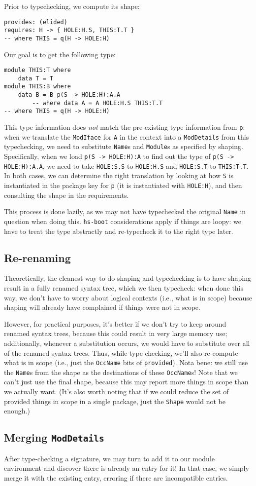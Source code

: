 \documentclass{article}
\begin{document}
Prior to typechecking, we compute its shape:

\begin{verbatim}
provides: (elided)
requires: H -> { HOLE:H.S, THIS:T.T }
-- where THIS = q(H -> HOLE:H)
\end{verbatim}

Our goal is to get the following type:

\begin{verbatim}
module THIS:T where
    data T = T
module THIS:B where
    data B = B p(S -> HOLE:H):A.A
        -- where data A = A HOLE:H.S THIS:T.T
-- where THIS = q(H -> HOLE:H)
\end{verbatim}

This type information does \emph{not} match the pre-existing
type information from \verb|p|: when we translate the \verb|ModIface| for
\verb|A| in the context into a \verb|ModDetails| from this typechecking,
we need to substitute \verb|Name|s and \verb|Module|s
as specified by shaping.  Specifically, when we load \verb|p(S -> HOLE:H):A|
to find out the type of \verb|p(S -> HOLE:H):A.A|,
we need to take \verb|HOLE:S.S| to \verb|HOLE:H.S| and \verb|HOLE:S.T| to \verb|THIS:T.T|.
In both cases, we can determine the right translation by looking at how \verb|S| is
instantiated in the package key for \verb|p| (it is instantiated with \verb|HOLE:H|),
and then consulting the shape in the requirements.

This process is done lazily, as we may not have typechecked the original
\verb|Name| in question when doing this.  \verb|hs-boot| considerations apply
if things are loopy: we have to treat the type abstractly and re-typecheck it
to the right type later.


\subsection{Re-renaming}

Theoretically, the cleanest way to do shaping and typechecking is to have shaping
result in a fully renamed syntax tree, which we then typecheck: when done this way,
we don't have to worry about logical contexts (i.e., what is in scope) because
shaping will already have complained if things were not in scope.

However, for practical purposes, it's better if we don't try to keep
around renamed syntax trees, because this could result in very large
memory use; additionally, whenever a substitution occurs, we would have
to substitute over all of the renamed syntax trees.  Thus, while
type-checking, we'll also re-compute what is in scope (i.e.,  just the
\verb|OccName| bits of \verb|provided|). Nota bene: we still use the
\verb|Name|s from the shape as the destinations of these
\verb|OccName|s!  Note that we can't just use the final shape, because
this may report more things in scope than we actually want.  (It's also
worth noting that if we could reduce the set of provided things in
scope in a single package, just the \verb|Shape| would not be enough.)

\subsection{Merging \texttt{ModDetails}}

After type-checking a signature, we may turn to add it to our module
environment and discover there is already an entry for it!  In that case,
we simply merge it with the existing entry, erroring if there are incompatible
entries.
\end{document}

